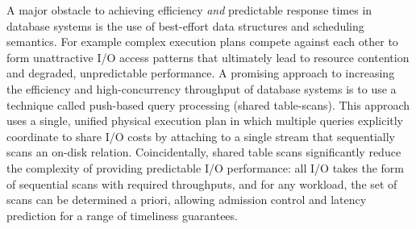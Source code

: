 \documentclass{sig-alternate}
\begin{document}
A major obstacle to achieving efficiency \emph{and} predictable response times
in database systems is the use of best-effort data structures and scheduling
semantics. For example complex execution plans compete against each other to
form unattractive I/O access patterns that ultimately lead to resource
contention and degraded, unpredictable performance. A promising approach to
increasing the efficiency and high-concurrency throughput of database systems
is to use a technique called push-based query processing (shared table-scans).
This approach uses a single, unified physical execution plan in which multiple
queries explicitly coordinate to share I/O costs by attaching to a single
stream that sequentially scans an on-disk relation.  Coincidentally, shared
table scans significantly reduce the complexity of providing predictable I/O
performance: all I/O takes the form of sequential scans with required
throughputs, and for any workload, the set of scans can be determined a
priori, allowing admission control and latency prediction for a range of
timeliness guarantees.
\end{document}
